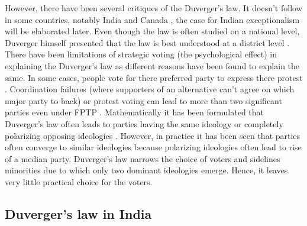 \begin{sloppypar}
\vspace{0.3cm}

However, there have been several critiques of the Duverger's law. It doesn't follow in some countries, notably India and Canada \citep{gaines1999duverger}, the case for Indian exceptionalism will be elaborated later. Even though the law is often studied on a national level, Duverger himself presented that the law is best understood at a district level \citep{diwakar2007duverger}. There have been limitations of strategic voting (the psychological effect) in explaining the Duverger's law as different reasons have been found to explain the same. In some cases, people vote for there preferred party to express there protest \citep{ziegfeld2021accounts}. Coordination failures (where supporters of an alternative can’t agree on which major party to back) or protest voting can lead to more than two significant parties even under FPTP \citep{singer2013duverger}. Mathematically it has been formulated that Duverger's law often leads to parties having the same ideology or completely polarizing opposing ideologies \citep{fey2007duverger}. However, in practice it has been seen that parties often converge to similar ideologies because polarizing ideologies often lead to rise of a median party.  Duverger's law narrows the choice of voters and sidelines minorities due to which only two dominant ideologies emerge. Hence, it leaves very little practical choice for the voters.

\subsection{Duverger's law in India}


\end{sloppypar}
